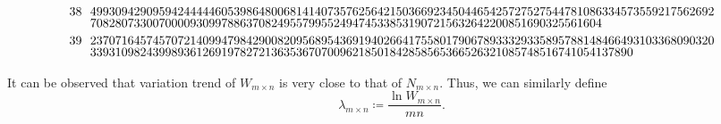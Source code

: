 \documentclass[11pt]{article}
\begin{document}
\begin{align*}
        \shortstack[l]{38\\\phantom{0}}~~ &
        \shortstack[l]{4993094290959424444460539864800681414073576256421503669234504465425727527544781086334573559217562692\\7082807330070000930997886370824955799552494745338531907215632642200851690325561604}\\
        \shortstack[l]{39\\\phantom{0}}~~ &
        \shortstack[l]{2370716457457072140994798429008209568954369194026641755801790678933329335895788148466493103368090320\\339310982439989361269197827213635367070096218501842858565366526321085748516741054137890}
    \end{align*}
    \normalsize

    It can be observed that variation trend of $W_{m\times n}$ is very close to that of $N_{m\times n}$.
    Thus, we can similarly define
    \[
        \lambda_{m\times n} \coloneq \frac{\ln W_{m\times n}}{mn}.
    \]
\end{document}
